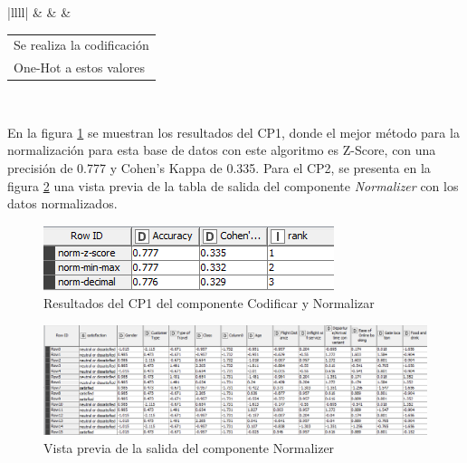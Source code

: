 \begin{table}[H]
\begin{spacing}{1.15}
{\begin{tabular}{|llll|}
			                                                                 &  &                       & \begin{tabular}[c]{@{}l@{}}Se realiza la codificación\\ One-Hot a estos valores\end{tabular}                     \\ \hline
		\end{tabular}%
	}
	\end{spacing}
\end{table}

En la figura \ref{fig:comparacion-norm} se muestran los resultados del CP1, donde el mejor método para la normalización para esta base de datos con este algoritmo es Z-Score, con una precisión de 0.777 y Cohen's Kappa de 0.335. Para el CP2, se presenta en la figura \ref{fig:norm-cp1} una vista previa de la tabla de salida  del componente \textit{Normalizer} con los datos normalizados.

\begin{figure}[H]
	\centering
	\includegraphics[width=0.5\linewidth]{"figuras/capi 3/pruebas-jenn/comparacion-norm"}
	\caption{Resultados del CP1 del componente Codificar y Normalizar}
	\label{fig:comparacion-norm}
\end{figure}


\begin{figure}[H]
	\centering
	\includegraphics[width=0.8\linewidth]{"figuras/capi 3/pruebas-jenn/norm-cp1"}
	\caption{Vista previa de la salida del componente Normalizer}
	\label{fig:norm-cp1}
\end{figure}



